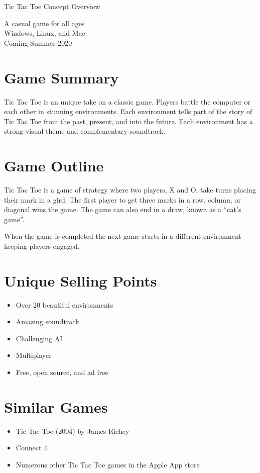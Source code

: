\documentclass{article}
\begin{document}
Tic Tac Toe Concept Overview

A casual game for all ages\\
Windows, Linux, and Mac\\
Coming Summer 2020

\section{Game Summary}
Tic Tac Toe is an unique take on a classic game. Players battle the computer or
each other in stunning environments. Each environment tells part of the story of
Tic Tac Toe from the past, present, and into the future. Each environment has
a strong visual theme and complementary soundtrack.

\section{Game Outline}
Tic Tac Toe is a game of strategy where two players, X and O, take turns placing
their mark in a gird. The first player to get three marks in a row, column, or
diagonal wins the game. The game can also end in a draw, known as a
``cat's game''.

When the game is completed the next game starts in a different environment
keeping players engaged.

\section{Unique Selling Points}
\begin{itemize}
  \item Over 20 beautiful environments
  \item Amazing soundtrack
  \item Challenging AI
  \item Multiplayer
  \item Free, open source, and ad free
\end{itemize}

\section{Similar Games}
\begin{itemize}
  \item Tic Tac Toe (2004) by James Richey
  \item Connect 4
  \item Numerous other Tic Tac Toe games in the Apple App store
\end{itemize}
\end{document}
